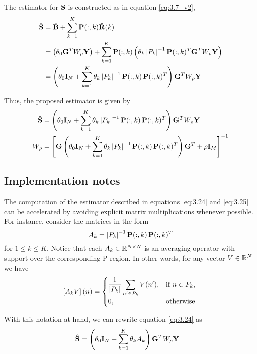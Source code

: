 The estimator for $\mathbf{S}$ is constructed as in equation \eqref{eq:3.7_v2},
\begin{align}
    \hat{\mathbf{S}}
    &=
    \hat{\mathbf{B}} + \sum_{k=1}^K \mathbf{P}(:,k) \hat{\mathbf{R}}(k)
    \nonumber \\
    &=
    \left( \theta_0 \mathbf{G}^T W_\rho \mathbf{Y} \right)
    + \sum_{k=1}^K \mathbf{P}(:,k) \left( \theta_k \left| {P_k} \right|^{-1} \mathbf{P}(:,k)^T \mathbf{G}^T W_\rho \mathbf{Y} \right)
    \nonumber \\
    &=
    \left(  \theta_0 \mathbf{I}_N + \sum_{k=1}^K \theta_k \left| {P_k} \right|^{-1} 
    \mathbf{P}(:,k)\, \mathbf{P}(:,k)^T
     \right) \mathbf{G}^T W_\rho \mathbf{Y}
\end{align}

Thus, the proposed estimator is given by
\begin{align}
    \hat{\mathbf{S}}
    &=
    \left(  \theta_0 \mathbf{I}_N + \sum_{k=1}^K \theta_k \left| {P_k} \right|^{-1} 
    \mathbf{P}(:,k)\, \mathbf{P}(:,k)^T
     \right) \mathbf{G}^T W_\rho \mathbf{Y}
    \label{eq:3.24}
    \\
    W_\rho &=
    \left[ \mathbf{G} \left(  \theta_0 \mathbf{I}_N + \sum_{k=1}^K \theta_k \left| {P_k} \right|^{-1} 
    \mathbf{P}(:,k)\, \mathbf{P}(:,k)^T
     \right) \mathbf{G}^T + \rho \mathbf{I}_M  \right]^{-1}
    \label{eq:3.25}
\end{align}

\subsection{Implementation notes}

The computation of the estimator described in equations \eqref{eq:3.24} and \eqref{eq:3.25} can be accelerated by avoiding explicit matrix multiplications whenever possible.
%
For instance, consider the matrices in the form 
\begin{equation}
    A_k = \left| {P_k} \right|^{-1} \mathbf{P}(:,k)\, \mathbf{P}(:,k)^T
\end{equation}
for $1\leq k \leq K$. 
%
Notice that each $A_k \in \mathbb{R}^{N\times N}$ is an averaging operator with support over the corresponding P-region.
%
In other words, for any vector $V\in \mathbb{R}^{N}$ we have
\begin{equation}
    \left[ A_k V \right](n) =
    \begin{cases}
        {\displaystyle \frac{1}{ \left| {P_k} \right| } \sum_{n'\in P_k} V(n')}, 
        &\text{if } n\in P_k, \\
        0, &\text{otherwise}.
    \end{cases}
\end{equation}

With this notation at hand, we can rewrite equation \eqref{eq:3.24} as
\begin{align}
    \hat{\mathbf{S}}
    &=
    \left( \theta_0 \mathbf{I}_N + \sum_{k=1}^K \theta_k A_k \right)\mathbf{G}^T W_\rho \mathbf{Y}
\end{align}

